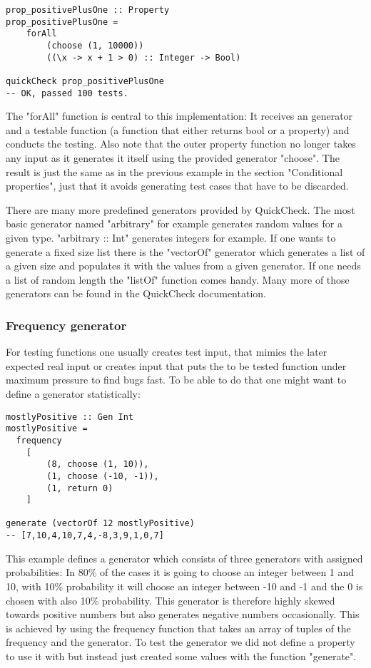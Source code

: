 \documentclass[a4paper, 12pt]{article} %
\begin{document}
\begin{verbatim}
prop_positivePlusOne :: Property
prop_positivePlusOne = 
    forAll
        (choose (1, 10000))
        ((\x -> x + 1 > 0) :: Integer -> Bool)

quickCheck prop_positivePlusOne
-- OK, passed 100 tests.
\end{verbatim}

The "forAll" function is central to this implementation: It receives an generator and a testable function (a function that either returns bool or a property) and conducts the testing. Also note that the outer property function no longer takes any input as it generates it itself using the provided generator "choose". The result is just the same as in the previous example in the section "Conditional properties", just that it avoids generating test cases that have to be discarded.

There are many more predefined generators provided by QuickCheck. The most basic generator named "arbitrary" for example generates random values for a given type. "arbitrary :: Int" generates integers for example. If one wants to generate a fixed size list there is the "vectorOf" generator which generates a list of a given size and populates it with the values from a given generator. If one needs a list of random length the "listOf" function comes handy. Many more of those generators can be found in the QuickCheck documentation. \cite{documentation}

\subsubsection{Frequency generator}

For testing functions one usually creates test input, that mimics the later expected real input or creates input that puts the to be tested function under maximum pressure to find bugs fast. To be able to do that one might want to define a generator statistically:

\begin{verbatim}
mostlyPositive :: Gen Int
mostlyPositive =
  frequency
    [ 
        (8, choose (1, 10)),
        (1, choose (-10, -1)),
        (1, return 0)
    ]

generate (vectorOf 12 mostlyPositive) 
-- [7,10,4,10,7,4,-8,3,9,1,0,7]
\end{verbatim}

This example defines a generator which consists of three generators with assigned probabilities: In 80\% of the cases it is going to choose an integer between 1 and 10, with 10\% probability it will choose an integer between -10 and -1 and the 0 is chosen with also 10\% probability. This generator is therefore highly skewed towards positive numbers but also generates negative numbers occasionally. This is achieved by using the frequency function that takes an array of tuples of the frequency and the generator. To test the generator we did not define a property to use it with but instead just created some values with the function "generate".
\end{document}
